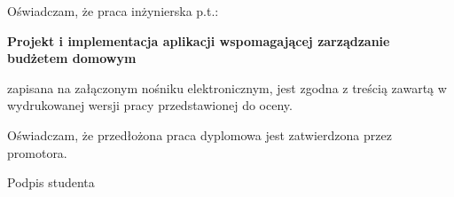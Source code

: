 \documentclass[a4paper, 10pt, twoside, openright]{report}
\begin{document}
\begin{large}
{Oświadczam, że praca inżynierska p.t.:}\\
\begin{center}
\textbf{Projekt i implementacja aplikacji wspomagającej zarządzanie budżetem domowym}\\
\end{center}
{zapisana na załączonym nośniku elektronicznym, jest zgodna z treścią zawartą w 
wydrukowanej wersji pracy przedstawionej do oceny.}

{Oświadczam, że przedłożona praca dyplomowa jest zatwierdzona 
przez promotora.}



\bigskip
\bigskip
\begin{flushright}
    {Podpis studenta}
\end{flushright}


\end{large}
\end{document}
